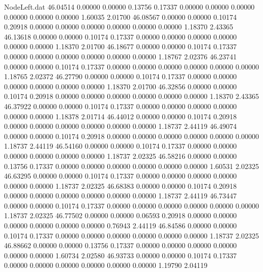 \begin{filecontents}{NodeLeft.dat}
  46.04514    0.00000    0.00000     0.13756    0.17337    0.00000    0.00000    0.00000    0.00000    0.00000    0.00000    1.60035    2.01700
  46.08567    0.00000    0.00000     0.10174    0.20918    0.00000    0.00000    0.00000    0.00000    0.00000    0.00000    1.18370    2.43365
  46.13618    0.00000    0.00000     0.10174    0.17337    0.00000    0.00000    0.00000    0.00000    0.00000    0.00000    1.18370    2.01700
  46.18677    0.00000    0.00000     0.10174    0.17337    0.00000    0.00000    0.00000    0.00000    0.00000    0.00000    1.18767    2.02376
  46.23741    0.00000    0.00000     0.10174    0.17337    0.00000    0.00000    0.00000    0.00000    0.00000    0.00000    1.18765    2.02372
  46.27790    0.00000    0.00000     0.10174    0.17337    0.00000    0.00000    0.00000    0.00000    0.00000    0.00000    1.18370    2.01700
  46.32856    0.00000    0.00000     0.10174    0.20918    0.00000    0.00000    0.00000    0.00000    0.00000    0.00000    1.18370    2.43365
  46.37922    0.00000    0.00000     0.10174    0.17337    0.00000    0.00000    0.00000    0.00000    0.00000    0.00000    1.18378    2.01714
  46.44012    0.00000    0.00000     0.10174    0.20918    0.00000    0.00000    0.00000    0.00000    0.00000    0.00000    1.18737    2.44119
  46.49074    0.00000    0.00000     0.10174    0.20918    0.00000    0.00000    0.00000    0.00000    0.00000    0.00000    1.18737    2.44119
  46.54160    0.00000    0.00000     0.10174    0.17337    0.00000    0.00000    0.00000    0.00000    0.00000    0.00000    1.18737    2.02325
  46.58216    0.00000    0.00000     0.13756    0.17337    0.00000    0.00000    0.00000    0.00000    0.00000    0.00000    1.60531    2.02325
  46.63295    0.00000    0.00000     0.10174    0.17337    0.00000    0.00000    0.00000    0.00000    0.00000    0.00000    1.18737    2.02325
  46.68383    0.00000    0.00000     0.10174    0.20918    0.00000    0.00000    0.00000    0.00000    0.00000    0.00000    1.18737    2.44119
  46.73447    0.00000    0.00000     0.10174    0.17337    0.00000    0.00000    0.00000    0.00000    0.00000    0.00000    1.18737    2.02325
  46.77502    0.00000    0.00000     0.06593    0.20918    0.00000    0.00000    0.00000    0.00000    0.00000    0.00000    0.76943    2.44119
  46.84586    0.00000    0.00000     0.10174    0.17337    0.00000    0.00000    0.00000    0.00000    0.00000    0.00000    1.18737    2.02325
  46.88662    0.00000    0.00000     0.13756    0.17337    0.00000    0.00000    0.00000    0.00000    0.00000    0.00000    1.60734    2.02580
  46.93733    0.00000    0.00000     0.10174    0.17337    0.00000    0.00000    0.00000    0.00000    0.00000    0.00000    1.19790    2.04119

\end{filecontents}
